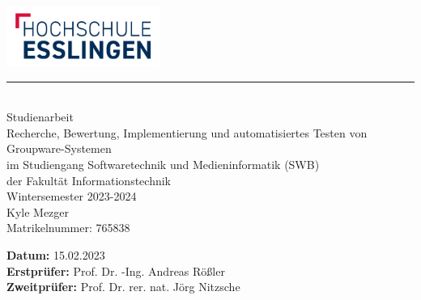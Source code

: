 \newcommand{\HRule}[2]{\noindent\rule[#1]{\linewidth}{#2}} %
\newcommand{\vlinespace}[1]{\vspace*{#1\baselineskip}} %
\newcommand{\titleemph}[1]{\textbf{#1}} %

\begin{titlepage}
 \sffamily %
      \hfill \includegraphics[width=5cm]{images/hslogo_small.png}
      \HRule{13pt}{1pt} 
   \centering
      \Large
      \vlinespace{3}\\
      Studienarbeit\\
      \huge
      Recherche, Bewertung, Implementierung und automatisiertes Testen von Groupware-Systemen\\
%
      \Large
      \vlinespace{2}
          im Studiengang Softwaretechnik und Medieninformatik (SWB)\\
          der Fakultät Informationstechnik\\
%      
      Wintersemester 2023-2024\\
%     
      \vlinespace{2}
      Kyle Mezger\\
      Matrikelnummer: 765838
%
   \vfill
   \raggedright
%   
   \large
   \titleemph{Datum:} 15.02.2023 \\ %
   \titleemph{Erstprüfer:} Prof. Dr. -Ing. Andreas Rößler \\
   \titleemph{Zweitprüfer:} Prof. Dr. rer. nat. Jörg Nitzsche \\

\end{titlepage}
